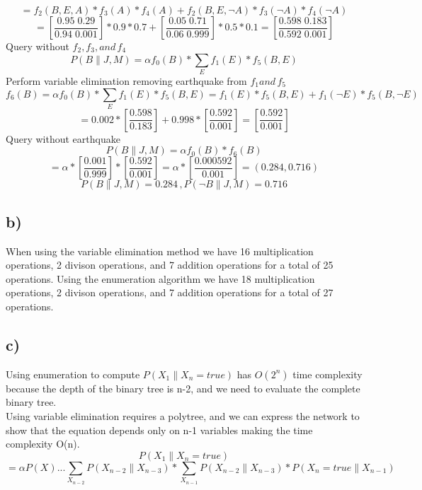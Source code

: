 \documentclass[11pt]{article} %
\begin{document}
\begin{equation}
= f_2 (B,E,A)*f_3 (A)*f_4 (A)+ f_2 (B,E,\neg A)*f_3 (\neg A)*f_4 (\neg A)
\end{equation}
\begin{equation}
= [\frac{0.95\;0.29}{0.94\;0.001}] * 0.9 * 0.7 + [\frac{0.05\;0.71}{0.06\;0.999}] * 0.5*0.1 = [\frac{0.598\;0.183}{0.592\;0.001}] 
\end{equation}
Query without $f_2, f_3, and\, f_4$
\begin{equation}
P(B \| J, M) = \alpha f_0(B) * \sum_{E} f_1(E) * f_5(B, E)
\end{equation}
Perform variable elimination removing earthquake from $f_1 and\, f_5$
\begin{equation}
f_6(B) =  \alpha f_0(B) * \sum_{E} f_1(E) * f_5(B, E)  = f_1(E) * f_5(B, E) + f_1(\neg E) * f_5(B, \neg E)
\end{equation}
\begin{equation}
= 0.002 *[ \frac{0.598}{0.183}] + 0.998 *[\frac{0.592}{0.001}] = [\frac{0.592}{0.001}]
\end{equation}
Query without earthquake
\begin{equation}
P(B \| J, M) = \alpha f_0(B) * f_6(B)
\end{equation}
\begin{equation}
= \alpha * [\frac{0.001}{0.999}] * [\frac{0.592}{0.001}]  = \alpha * [\frac{0.000592}{0.001}]  = (0.284, 0.716) 
\end{equation}
\begin{equation}
P(B \| J, M) = 0.284\,,
P(\neg B \| J, M) = 0.716
\end{equation}
\subsection*{b)}
When using the variable elimination method we have 16 multiplication operations, 2 divison operations, and 7 addition operations for a total of 25 operations. Using the enumeration algorithm we have 18 multiplication operations, 2 divison operations, and 7 addition operations for a total of 27 operations.

\subsection*{c)}
Using enumeration to compute $P(X_1\|X_n = true)$ has $O(2^n)$ time complexity because the depth of the binary tree is n-2, and we need to evaluate the complete binary tree.\\
Using variable elimination requires a polytree, and we can express the network to show that the equation depends only on n-1 variables making the time complexity O(n).
\begin{equation} \tag{1}
P(X_1\|X_n = true)
\end{equation}
\begin{equation} \tag{2}
= \alpha P(X)...\sum_{X_{n-2}} P(X_{n-2}\| X_{n-3}) * \sum_{X_{n-1}} P(X_{n-2}\| X_{n-3})  * P(X_n = true \| X_{n-1})
\end{equation}
\end{document}
